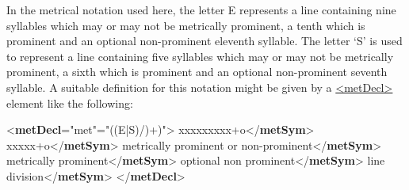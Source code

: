 In the metrical notation used here, the letter E represents a line containing nine syllables which may or may not be metrically prominent, a tenth which is prominent and an optional non-prominent eleventh syllable. The letter ‘S’ is used to represent a line containing five syllables which may or may not be metrically prominent, a sixth which is prominent and an optional non-prominent seventh syllable. A suitable definition for this notation might be given by a \hyperref[TEI.metDecl]{<metDecl>} element like the following: \par\bgroup{}\exampleFont \begin{shaded}\noindent\mbox{}{<\textbf{metDecl}\hspace*{1em}{type}="{met}"\hspace*{1em}{pattern}="{((E|S)/)+)}">}\mbox{}\newline 
{}xxxxxxxxx+o{</\textbf{metSym}>}\mbox{}\newline 
{}xxxxx+o{</\textbf{metSym}>}\mbox{}\newline 
{}metrically prominent or non-prominent{</\textbf{metSym}>}\mbox{}\newline 
{}metrically prominent{</\textbf{metSym}>}\mbox{}\newline 
{}optional non prominent{</\textbf{metSym}>}\mbox{}\newline 
{}line division{</\textbf{metSym}>}\mbox{}\newline 
{</\textbf{metDecl}>}\end{shaded}\egroup\par \par
